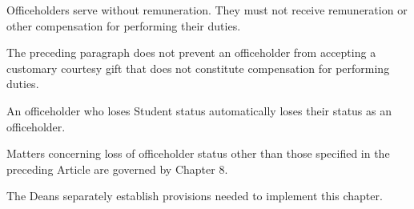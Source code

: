\begin{articles}
\begin{paragraphs}
  \end{paragraphs}
  \item Officeholders serve without remuneration. They must not receive remuneration or other compensation for performing their duties.
  \begin{paragraphs}
    \item The preceding paragraph does not prevent an officeholder from accepting a customary courtesy gift that does not constitute compensation for performing duties.
  \end{paragraphs}
  \item An officeholder who loses Student status automatically loses their status as an officeholder.
  \item Matters concerning loss of officeholder status other than those specified in the preceding Article are governed by Chapter 8.
  \item The Deans separately establish provisions needed to implement this chapter.
\end{articles}

